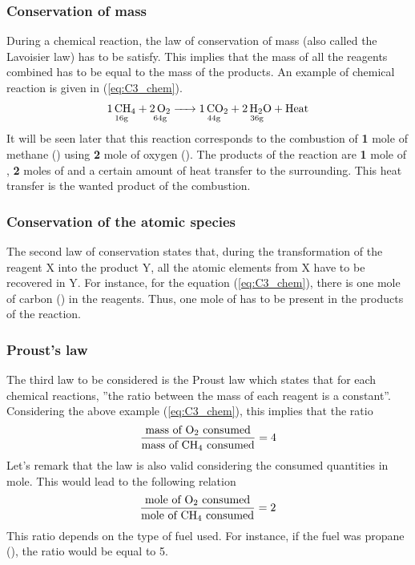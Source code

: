 \subsubsection{Conservation of mass}
During a chemical reaction, the law of conservation of mass (also called the Lavoisier law) has to be satisfy. This implies that the mass of all the reagents combined has to be equal to the mass of the products. An example of chemical reaction is given in (\ref{eq:C3_chem}).
\begin{equation}
    \underset{\mathrm{16g}}{\ce{1CH4}} \ce{+} \underset{\mathrm{64g}}{\ce{2O2}} \ce{->} \underset{\mathrm{44g}}{\ce{1CO2}} \ce{+} \underset{\mathrm{36g}}{\ce{2H2O}} \ce{+}\text{Heat}\label{eq:C3_chem}
\end{equation}
It will be seen later that this reaction corresponds to the combustion of \textbf{1} mole of methane () using \textbf{2} mole of oxygen (). The products of the reaction are \textbf{1} mole of , \textbf{2} moles of  and a certain amount of heat transfer to the surrounding. This heat transfer is the wanted product of the combustion.

\subsubsection{Conservation of the atomic species}
The second law of conservation states that, during the transformation of the reagent X into the product Y, all the atomic elements from X have to be recovered in Y. For instance, for the equation (\ref{eq:C3_chem}), there is one mole of carbon () in the reagents. Thus, one mole of  has to be present in the products of the reaction.
\newpage
\subsubsection{Proust's law}
The third law to be considered is the Proust law which states that for each chemical reactions, ''the ratio between the mass of each reagent is a constant''. Considering the above example (\ref{eq:C3_chem}), this implies that the ratio
\begin{equation}
    \frac{\text{mass of \ce{O2} consumed}}{\text{mass of \ce{CH4} consumed}} = 4
\end{equation}
Let's remark that the law is also valid considering the consumed quantities in mole. This would lead to the following relation
\begin{equation}
    \frac{\text{mole of \ce{O2} consumed}}{\text{mole of \ce{CH4} consumed}} = 2  \label{eq:C3_molratio}
\end{equation}
This ratio depends on the type of fuel used. For instance, if the fuel was propane (), the ratio would be equal to 5.

